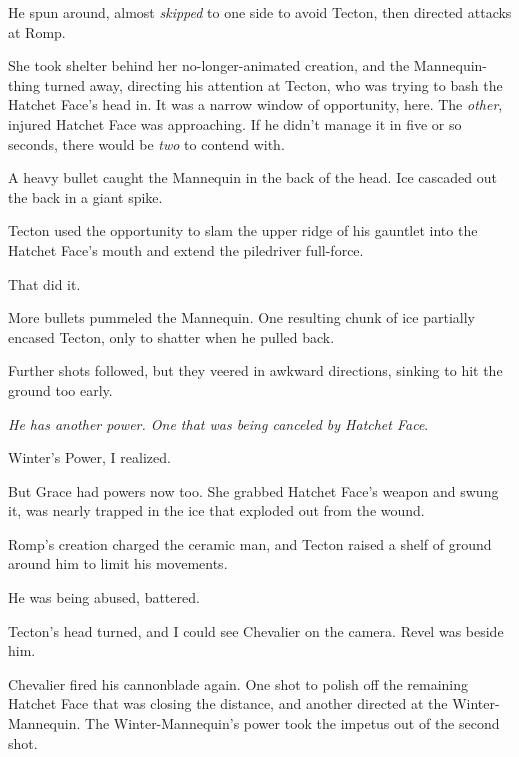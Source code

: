 He spun around, almost \emph{skipped} to one side to avoid Tecton, then directed attacks at Romp.



She took shelter behind her no-longer-animated creation, and the Mannequin-thing turned away, directing his attention at Tecton, who was trying to bash the Hatchet Face's head in.  It was a narrow window of opportunity, here.  The \emph{other}, injured Hatchet Face was approaching.  If he didn't manage it in five or so seconds, there would be \emph{two} to contend with.



A heavy bullet caught the Mannequin in the back of the head.  Ice cascaded out the back in a giant spike.



Tecton used the opportunity to slam the upper ridge of his gauntlet into the Hatchet Face's mouth and extend the piledriver full-force.



That did it.



More bullets pummeled the Mannequin.  One resulting chunk of ice partially encased Tecton, only to shatter when he pulled back.



Further shots followed, but they veered in awkward directions, sinking to hit the ground too early.



\emph{He has another power.  One that was being canceled by Hatchet Face}.



Winter's Power, I realized.



But Grace had powers now too.  She grabbed Hatchet Face's weapon and swung it, was nearly trapped in the ice that exploded out from the wound.



Romp's creation charged the ceramic man, and Tecton raised a shelf of ground around him to limit his movements.



He was being abused, battered.



Tecton's head turned, and I could see Chevalier on the camera.  Revel was beside him.



Chevalier fired his cannonblade again.  One shot to polish off the remaining Hatchet Face that was closing the distance, and another directed at the Winter-Mannequin.  The Winter-Mannequin's power took the impetus out of the second shot.



